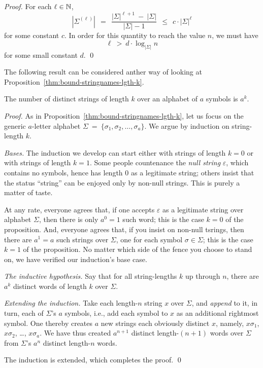 \begin{proof}
\noindent
For each $\ell \in \mathbb{N}$,
\[ |\Sigma^{(\ell)}| \ \ = \ \ \frac{|\Sigma|^{\ell+1} \ - \ |\Sigma|}
{|\Sigma| -1} \ \ \leq \ \ c \cdot |\Sigma|^{\ell}
\]
for some constant $c$.  In order for this quantity to reach the value
$n$, we must have
\[ \ell \ > \ d \cdot \log_{|\Sigma|} n   \]
for some small constant $d$.  \qed
\end{proof}

The following result can be considered anther way of looking at
Proposition~\ref{thm:bound-stringnames-lgth-k}.

\begin{prop}
\label{thm:Num-strings-lgth-k}
The number of distinct strings of length $k$ over an alphabet of $a$
symbols is $a^k$.
\end{prop}

\begin{proof}
As in Proposition~\ref{thm:bound-stringnames-lgth-k}, let us focus on
the generic $a$-letter alphabet $\Sigma \ = \ \{\sigma_1, \sigma_2,
\ldots, \sigma_a\}$.  We argue by induction on string-length $k$.

\noindent
{\it Bases.}
The induction we develop can start either with strings of length $k=0$
or with strings of length $k=1$.  Some people countenance the {\it
  null string}  
$\varepsilon$,  
 which contains no
symbols, hence has length $0$ as a legitimate string; others insist
that the status ``string'' can be enjoyed only by non-null strings.
This is purely a matter of taste.

At any rate, everyone agrees that, if one accepts $\varepsilon$ as a
legitimate string over alphabet $\Sigma$, then there is only $a^0 = 1$
such word; this is the case $k=0$ of the proposition.  And, everyone
agrees that, if you insist on non-null tsrings, then there are $a^1 =
a$ such strings over $\Sigma$, one for each symbol $\sigma \in
\Sigma$; this is the case $k=1$ of the proposition.  No matter which
side of the fence you choose to stand on, we have verified our
induction's base case.

\noindent
{\it The inductive hypothesis.}
Say that for all string-lengths $k$ up through $n$, there are $a^k$
distinct words of length $k$ over $\Sigma$.

\noindent
{\it Extending the induction.}
Take each length-$n$ string $x$ over $\Sigma$, and {\em append}
 to it, in turn, each of $\Sigma$'s
$a$ symbols, i.e., add each symbol to $x$ as an additional rightmost
symbol.  One thereby creates $a$ new strings each obviously distinct
$x$, namely, $x \sigma_1$, $x \sigma_2$, \ldots, $x \sigma_a$.  We
have thus created $a^{n+1}$ distinct length-$(n+1)$ words over
$\Sigma$ from $\Sigma$'s $a^n$ distinct length-$n$ words.

The induction is extended, which completes the proof.  \qed
\end{proof}

